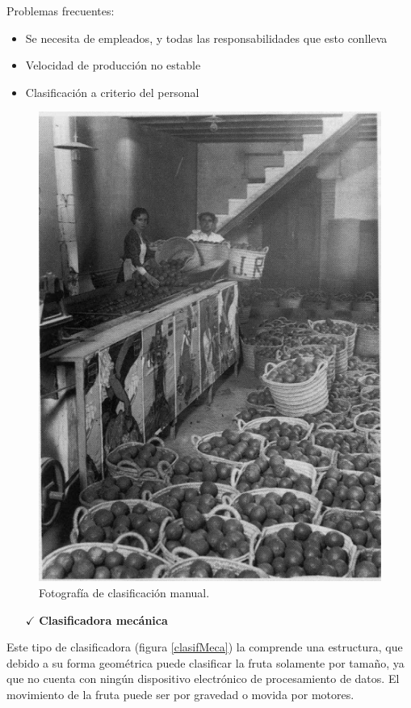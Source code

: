 \documentclass[twoside,spanish,ESP,MSc]{plantillaLabUPV}
\theoremstyle{definition}
\begin{document}
Problemas frecuentes:
\begin{itemize}
\itemsep 0em
 \item Se necesita de empleados, y todas las responsabilidades que esto conlleva
 \item Velocidad de producción no estable
 \item Clasificación a criterio del personal
\end{itemize}


\begin{figure}[h]
  \centering
     \includegraphics[scale=.40]{ima/clasifMan.jpg}
   \caption{Fotografía de clasificación manual.}
   \label{clasifMan}
\end{figure}

\begin{itemize}
	\item[$\checkmark$]{\bf Clasificadora mecánica}
\end{itemize}
	

Este tipo de clasificadora (figura \ref{clasifMeca}) la comprende una estructura, que debido a su forma geométrica puede clasificar la fruta solamente por tamaño, ya que no cuenta con ningún dispositivo electrónico de procesamiento de datos. El movimiento de la fruta puede ser por gravedad o movida por motores.\\
\end{document}

